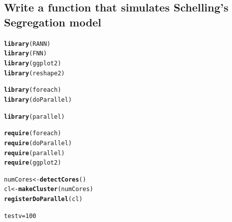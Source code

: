 \documentclass{article}\usepackage[]{graphicx}\usepackage[]{color}
\makeatletter
\newcommand{\hlnum}[1]{\textcolor[rgb]{0.686,0.059,0.569}{#1}}%
\newcommand{\hlstd}[1]{\textcolor[rgb]{0.345,0.345,0.345}{#1}}%
\newcommand{\hlkwb}[1]{\textcolor[rgb]{0.69,0.353,0.396}{#1}}%
\newcommand{\hlkwd}[1]{\textcolor[rgb]{0.737,0.353,0.396}{\textbf{#1}}}%
\newenvironment{kframe}{%
 \def\at@end@of@kframe{}%
 \ifinner\ifhmode%
  \def\at@end@of@kframe{\end{minipage}}%
  \begin{minipage}{\columnwidth}%
 \fi\fi%
 \def\FrameCommand##1{\hskip\@totalleftmargin \hskip-\fboxsep
 \colorbox{shadecolor}{##1}\hskip-\fboxsep
     \hskip-\linewidth \hskip-\@totalleftmargin \hskip\columnwidth}%
 \MakeFramed {\advance\hsize-\width
   \@totalleftmargin\z@ \linewidth\hsize
   \@setminipage}}%
 {\par\unskip\endMakeFramed%
 \at@end@of@kframe}
\newenvironment{knitrout}{}{} %
\makeatother
\begin{document}
\subsection{Write a function that simulates Schelling's Segregation model}
\begin{knitrout}
\color{fgcolor}\begin{kframe}
\begin{alltt}
\hlkwd{library}\hlstd{(RANN)}
\hlkwd{library}\hlstd{(FNN)}
\hlkwd{library}\hlstd{(ggplot2)}
\hlkwd{library}\hlstd{(reshape2)}

\hlkwd{library}\hlstd{(foreach)}
\hlkwd{library}\hlstd{(doParallel)}
\end{alltt}


{\ttfamily\noindent\itshape\color{messagecolor}{\#\# Loading required package: iterators\\\#\# Loading required package: parallel}}\begin{alltt}
\hlkwd{library}\hlstd{(parallel)}

\hlkwd{require}\hlstd{(foreach)}
\hlkwd{require}\hlstd{(doParallel)}
\hlkwd{require}\hlstd{(parallel)}
\hlkwd{require}\hlstd{(ggplot2)}

\hlstd{numCores} \hlkwb{<-} \hlkwd{detectCores}\hlstd{()}
\hlstd{cl} \hlkwb{<-} \hlkwd{makeCluster}\hlstd{(numCores)}
\hlkwd{registerDoParallel}\hlstd{(cl)}

\hlstd{testv} \hlkwb{=} \hlnum{100}


\end{alltt}
\end{kframe}
\end{knitrout}
\end{document}
